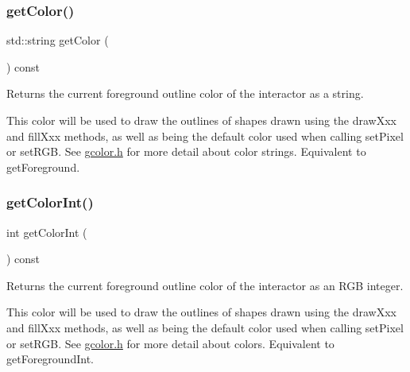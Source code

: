 \mbox{\label{classGDrawingSurface_aa061dfa488c31e18549d64363c1d0e34}} 
\subsubsection{\texorpdfstring{get\+Color()}{getColor()}}
{\footnotesize\ttfamily std\+::string get\+Color (\begin{DoxyParamCaption}{ }\end{DoxyParamCaption}) const\hspace{0.3cm}{\ttfamily [virtual]}}



Returns the current foreground outline color of the interactor as a string. 

This color will be used to draw the outlines of shapes drawn using the draw\+Xxx and fill\+Xxx methods, as well as being the default color used when calling set\+Pixel or set\+R\+GB. See \mbox{\hyperlink{gcolor_8h_source}{gcolor.\+h}} for more detail about color strings. Equivalent to get\+Foreground. \mbox{\label{classGDrawingSurface_a9635c7af766cdc3417f346683fa0e6c1}} 
\subsubsection{\texorpdfstring{get\+Color\+Int()}{getColorInt()}}
{\footnotesize\ttfamily int get\+Color\+Int (\begin{DoxyParamCaption}{ }\end{DoxyParamCaption}) const\hspace{0.3cm}{\ttfamily [virtual]}}



Returns the current foreground outline color of the interactor as an R\+GB integer. 

This color will be used to draw the outlines of shapes drawn using the draw\+Xxx and fill\+Xxx methods, as well as being the default color used when calling set\+Pixel or set\+R\+GB. See \mbox{\hyperlink{gcolor_8h_source}{gcolor.\+h}} for more detail about colors. Equivalent to get\+Foreground\+Int. \mbox{\label{classGDrawingSurface_a76f6964a11fde7c78e9751be184e1a3c}} 
